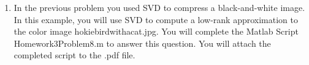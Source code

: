 \documentclass{article}
\theoremstyle{definition}
\newtheorem*{answer}{Answer}
\begin{document}
\begin{enumerate}[leftmargin=\labelsep]
\begin{enumerate}
\begin{answer}
\begin{figure}[H]
\begin{subfigure}{0.225\textwidth}
					            \caption{\(k=50\)}\label{fig:Thumb50}
				            \end{subfigure}
				            \caption{Original fingerprint image compared to its optimal rank-\(k \) approximations.}\label{fig:Thums}
			            \end{figure}
			            The code is given below:
			            \begin{mdframed}[backgroundcolor=lightgray]
			            \end{mdframed}

		            \end{answer}
	      \end{enumerate}

	\item In the previous problem you used SVD to compress a black-and-white image. In this example, you will use SVD to compute a low-rank approximation to the color image hokiebirdwithacat.jpg. You will complete the Matlab Script Homework3Problem8.m to answer this question. You will attach the completed script to the .pdf file.


\end{enumerate}
\end{document}
